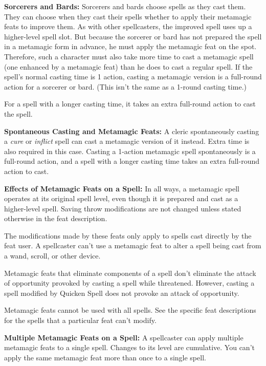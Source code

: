 \documentclass{article}
\begin{document}
\textbf{Sorcerers and Bards:} Sorcerers and bards choose spells as they cast them. 
They can choose when they cast their spells whether to apply their metamagic feats 
to improve them. As with other spellcasters, the improved spell uses up a higher-level 
spell slot. But because the sorcerer or bard has not prepared the spell in a metamagic 
form in advance, he must apply the metamagic feat on the spot. Therefore, such 
a character must also take more time to cast a metamagic spell (one enhanced by 
a metamagic feat) than he does to cast a regular spell. If the spell's normal casting 
time is 1 action, casting a metamagic version is a full-round action for a sorcerer 
or bard. (This isn't the same as a 1-round casting time.)

For a spell with a longer casting time, it takes an extra full-round action to 
cast the spell.

\textbf{Spontaneous Casting and Metamagic Feats: }A cleric spontaneously casting 
a \textit{cure }or \textit{inflict }spell can cast a metamagic version of it instead. 
Extra time is also required in this case. Casting a 1-action metamagic spell spontaneously 
is a full-round action, and a spell with a longer casting time takes an extra full-round 
action to cast.

\textbf{Effects of Metamagic Feats on a Spell:} In all ways, a metamagic spell 
operates at its original spell level, even though it is prepared and cast as a 
higher-level spell. Saving throw modifications are not changed unless stated otherwise 
in the feat description.

The modifications made by these feats only apply to spells cast directly by the 
feat user. A spellcaster can't use a metamagic feat to alter a spell being cast 
from a wand, scroll, or other device.

Metamagic feats that eliminate components of a spell don't eliminate the attack 
of opportunity provoked by casting a spell while threatened. However, casting a 
spell modified by Quicken Spell does not provoke an attack of opportunity.

Metamagic feats cannot be used with all spells. See the specific feat descriptions 
for the spells that a particular feat can't modify.

\vspace{12pt}
\textbf{Multiple Metamagic Feats on a Spell:} A spellcaster can apply multiple 
metamagic feats to a single spell. Changes to its level are cumulative. You can't 
apply the same metamagic feat more than once to a single spell.
\end{document}
